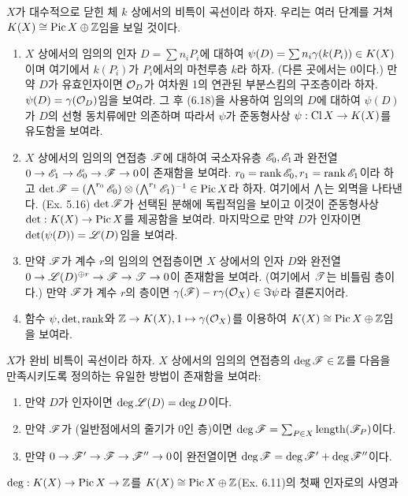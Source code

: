 \begin{enumerate}[label=\tb{6.\arabic*.},itemindent=0mm,itemsep=4mm]
{	\item {} $X$가 대수적으로 닫힌 체 $k$ 상에서의 비특이 곡선이라 하자.
	우리는 여러 단계를 거쳐 $K(X)\cong\operatorname{Pic} X\oplus\mathbb Z$임을 보일 것이다.
	\begin{enumerate}[label=(\alph*)]
	\item $X$ 상에서의 임의의 인자 $D=\sum n_iP_i$에 대하여 $\psi(D)=\sum n_i\gamma(k(P_i))\in K(X)$이며
	여기에서 $k(P_i)$가 $P_i$에서의 마천루층 $k$라 하자. (다른 곳에서는 0이다.)
	만약 $D$가 유효인자이면 $\mathcal{O}_D$가 여차원 1의 연관된 부분스킴의 구조층이라 하자. $\psi(D)=\gamma(\mathcal{O}_D)$임을 보여라.
	그 후 (6.18)을 사용하여 임의의 $D$에 대하여 $\psi(D)$가 $D$의 선형 동치류에만 의존하며
	따라서 $\psi$가 준동형사상 $\psi:\operatorname{Cl} X\rightarrow K(X)$를 유도함을 보여라.
	\item $X$ 상에서의 임의의 연접층 $\mathscr{F}$에 대하여 국소자유층 $\mathscr{E}_0,\mathscr{E}_1$과
	완전열 $0\rightarrow\mathscr{E}_1\rightarrow\mathscr{E}_0\rightarrow\mathscr{F}\rightarrow 0$이 존재함을 보여라.
	$r_0=\operatorname{rank}\mathscr{E}_0,r_1=\operatorname{rank}\mathscr{E}_1$이라 하고 $\det\mathscr{F}=(\bigwedge^{r_0}\mathscr{E}_0)\otimes(\bigwedge^{r_1}\mathscr{E}_1)^{-1}\in\operatorname{Pic} X$라 하자.
	여기에서 $\bigwedge$는 외멱을 나타낸다. (Ex. 5.16)
	$\det\mathscr{F}$가 선택된 분해에 독립적임을 보이고 이것이 준동형사상 $\mathrm{det}:K(X)\rightarrow\operatorname{Pic} X$를 제공함을 보여라.
	마지막으로 만약 $D$가 인자이면 $\det(\psi(D))=\mathscr{L}(D)$임을 보여라.
	\item 만약 $\mathscr{F}$가 계수 $r$의 임의의 연접층이면 $X$ 상에서의 인자 $D$와
	완전열 $0\rightarrow\mathscr{L}(D)^{\oplus r}\rightarrow\mathscr{F}\rightarrow\mathscr{T}\rightarrow 0$이 존재함을 보여라. (여기에서 $\mathscr{T}$는 비틀림 층이다.)
	만약 $\mathscr{F}$가 계수 $r$의 층이면 $\gamma(\mathscr{F})-r\gamma(\mathcal{O}_X)\in\Im\psi$라 결론지어라.
	\item 함수 $\psi,\mathrm{det,rank}$와 $\mathbb Z\rightarrow K(X),1\mapsto\gamma(\mathcal{O}_X)$를 이용하여 $K(X)\cong\operatorname{Pic} X\oplus\mathbb Z$임을 보여라.
	\end{enumerate}}
	\item $X$가 완비 비특이 곡선이라 하자. $X$ 상에서의 임의의 연접층의 
	$\deg\mathscr{F}\in\mathbb Z$를 다음을 만족시키도록 정의하는 유일한 방법이 존재함을 보여라:
	\begin{enumerate}[label=(\arabic*)]
	\item 만약 $D$가 인자이면 $\deg\mathscr{L}(D)=\deg D$이다.
	\item 만약 $\mathscr{F}$가 (일반점에서의 줄기가 0인 층)이면 $\deg\mathscr{F}=\sum_{P\in X}\operatorname{length}(\mathscr{F}_P)$이다.
	\item 만약 $0\rightarrow\mathscr{F}'\rightarrow\mathscr{F}\rightarrow\mathscr{F}''\rightarrow 0$이 완전열이면 $\deg\mathscr{F}=\deg\mathscr{F}'+\deg\mathscr{F}''$이다.
	\end{enumerate}
	\sol $\mathrm{deg}:K(X)\rightarrow\operatorname{Pic} X\rightarrow\mathbb Z$를 $K(X)\cong\operatorname{Pic} X\oplus\mathbb Z$(Ex. 6.11)의 첫째 인자로의 사영과

\end{enumerate}
